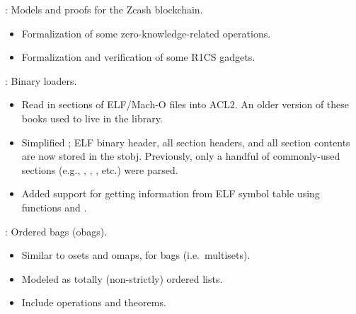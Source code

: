 
\begin{frame}

\newlibtitle

:
Models and proofs for the Zcash blockchain.
\begin{itemize}
\item Formalization of some zero-knowledge-related operations.
\item Formalization and verification of some R1CS gadgets.
\end{itemize}
\end{frame}


\begin{frame}

\newlibtitle

:
Binary loaders.
\begin{itemize}
\item Read in sections of ELF/Mach-O files into ACL2. An older version
      of these books used to live in the  library.
\item Simplified ; ELF binary header, all section
      headers, and all section contents are now stored in the 
      stobj. Previously, only a handful of commonly-used sections (e.g.,
      , , , etc.) were parsed.
\item Added support for getting information from ELF symbol table
      using functions  and
      .
\end{itemize}
\end{frame}


\begin{frame}

\newlibtitle

:
Ordered bags (obags).
\begin{itemize}
\item Similar to osets and omaps, for bags (i.e.\ multisets).
\item Modeled as totally (non-strictly) ordered lists.
\item Include operations and theorems.
\end{itemize}

\end{frame}

